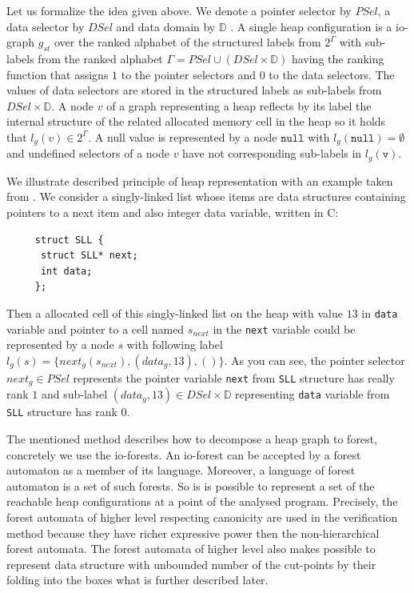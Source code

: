 Let us formalize the idea given above.
We denote a pointer selector by $PSel$, a data selector by $DSel$ and data domain by $\mathbb{D}$ \cite{techrep}.
A single heap configuration is a io-graph $g_{st}$ over the ranked alphabet of the structured labels from $2^\Gamma$
with sub-labels from the ranked alphabet $\Gamma = PSel \cup (DSel \times \mathbb{D})$ having the
ranking function that assigns $1$ to the pointer selectors and $0$ to the data selectors.
The values of data selectors are stored in the structured labels as sub-labels from $DSel \times \mathbb{D}$.
A node $v$ of a graph representing a heap reflects by its label the internal structure of
the related allocated memory cell in the heap so it holds that $l_g(v) \in 2^\Gamma$.
A null value is represented by a node $\texttt{null}$ with $l_g(\texttt{null}) = \emptyset$
and undefined selectors of a node $v$ have not corresponding  sub-labels in $l_g(\texttt{v})$.

\bexmp
We illustrate described principle of heap representation with an example taken from \cite{techrep}.
We consider a singly-linked list whose items are data structures containing pointers to
a next item and also integer data variable, written in C:
\begin{center}
\begin{minipage}{0.3\textwidth}
    \begin{verbatim}
     struct SLL {
      struct SLL* next;
      int data;
     };
    \end{verbatim}
\end{minipage}
\end{center}
Then a allocated cell of this singly-linked list on the heap with value $13$ in \texttt{data} variable and pointer to a cell named $s_{next}$
in the \texttt{next} variable could be represented
by a node $s$ with following label $l_g(s) = \{next_g(s_{next}),(data_g,13),()\}$.
As you can see, the pointer selector $next_g \in PSel$ represents the pointer variable \texttt{next} from \texttt{SLL} structure
has really rank $1$ and sub-label $(data_g,13) \in DSel\times \mathbb{D}$ representing \texttt{data} variable from \texttt{SLL} structure
has rank $0$.
\eexmp

The mentioned method describes how to decompose a heap graph to forest, concretely we use the io-forests.
An io-forest can be accepted by a forest automaton as a member of its language.
Moreover, a language of forest automaton is a set of such forests.
So is is possible to represent a set of the reachable heap configurations at a point of the analysed program.
Precisely, the forest automata of higher level respecting canonicity are used in the verification method
because they have richer expressive power then the non-hierarchical forest automata.
The forest automata of higher level also makes possible to represent data structure with unbounded number
of the cut-points by their folding into the boxes what is further described later.

